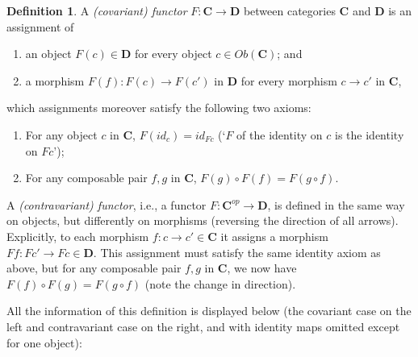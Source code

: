 \documentclass[a4paper]{book}
\theoremstyle{definition}
\theoremstyle{definition}
\newtheorem{definition}{Definition}[section]
\theoremstyle{definition}
\theoremstyle{theorem}
\theoremstyle{definition}
\begin{document}
	\begin{definition}
		A \textit{(covariant) functor}  $F: \textbf{C} \rightarrow \textbf{D}$ between categories \textbf{C} and \textbf{D} is an assignment of 
		\begin{enumerate}
			\item an object $F(c) \in \textbf{D}$ for every object $c \in Ob(\textbf{C})$; and 
			\item a morphism $F(f): F(c) \rightarrow F(c')$ in $\textbf{D}$ for every morphism $c \rightarrow c'$ in $\textbf{C}$, 
		\end{enumerate}
	which assignments moreover satisfy the following two axioms: 
		\begin{enumerate}
			\item For any object $c$ in \textbf{C}, $F(id_c) = id_{Fc}$ (`$F$ of the identity on $c$ is the identity on $Fc$'); 
			\item For any composable pair $f,g$ in \textbf{C}, $F(g) \circ F(f) = F(g \circ f)$.
		\end{enumerate} 
		A \textit{(contravariant) functor}, i.e., a functor $F: \textbf{C}^{op} \rightarrow \textbf{D}$, is defined in the same way on objects, but differently on morphisms (reversing the direction of all arrows). Explicitly, to each morphism $f: c \rightarrow c' \in \textbf{C}$ it assigns a morphism $Ff: Fc' \rightarrow Fc \in \textbf{D}$. This assignment must satisfy the same identity axiom as above, but for any composable pair $f,g$ in \textbf{C}, we now have $F(f) \circ F(g) = F(g \circ f)$ (note the change in direction). \par 
		All the information of this definition is displayed below (the covariant case on the left and contravariant case on the right, and with identity maps omitted except for one object): 
		\par 
		\vspace*{0.5cm} 
	\small
	\end{definition} \noindent 
\end{document}
